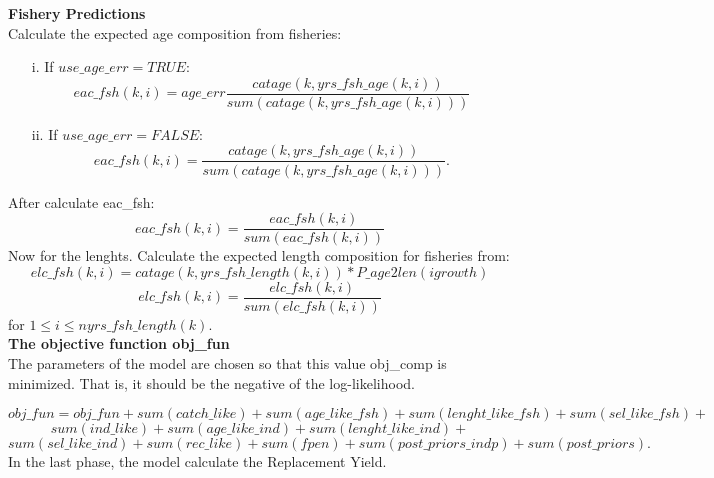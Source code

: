 \documentclass{article}
\begin{document}
\textbf{Fishery Predictions}\\
Calculate the expected age composition from fisheries:
\begin{itemize}
    \item [i.] If $use\_age\_err=TRUE$:
    \begin{equation}
    eac\_fsh(k,i)=age\_err\dfrac{catage(k,yrs\_fsh\_age(k,i))}{sum(catage(k,yrs\_fsh\_age(k,i)))}
\end{equation}
\item [ii.] If $use\_age\_err=FALSE$:
\begin{equation}
    eac\_fsh(k,i)=\dfrac{catage(k,yrs\_fsh\_age(k,i))}{sum(catage(k,yrs\_fsh\_age(k,i)))}.
\end{equation}
\end{itemize}
After calculate eac\_fsh:
\begin{equation}
    eac\_fsh(k,i)=\dfrac{eac\_fsh(k,i)}{sum(eac\_fsh(k,i))}
\end{equation}
Now for the lenghts. Calculate the expected length composition for fisheries from: 
\begin{equation}
    elc\_fsh(k,i)=catage(k,yrs\_fsh\_length(k,i))*P\_age2len(igrowth)
\end{equation}
\begin{equation}
    elc\_fsh(k,i)=\dfrac{elc\_fsh(k,i)}{sum(elc\_fsh(k,i))}
\end{equation}
for $1\leq i \leq nyrs\_fsh\_length(k)$.\\

\textbf{The objective function obj\_fun}\\

The parameters of the model are chosen so that this value obj\_comp is minimized. That is, it should be the negative of the log-likelihood.

\begin{equation}
    obj\_fun=obj\_fun+sum(catch\_like)+sum(age\_like\_fsh)+sum(lenght\_like\_fsh)+sum(sel\_like\_fsh)+
\end{equation}
\begin{equation*}
    sum(ind\_like)+sum(age\_like\_ind)+sum(lenght\_like\_ind)+
\end{equation*}
\begin{equation*}
    sum(sel\_like\_ind)+sum(rec\_like)+sum(fpen)+sum(post\_priors\_indp)+sum(post\_priors).
\end{equation*}
In the last phase, the model calculate the Replacement Yield.\\
\end{document}
